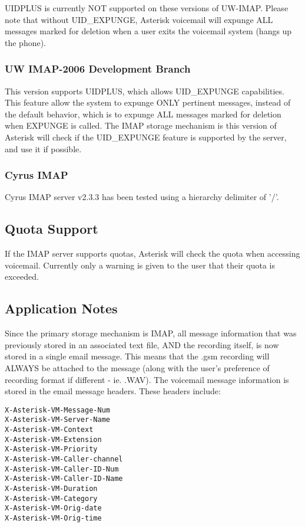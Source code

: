 UIDPLUS is currently NOT supported on these versions of UW-IMAP.  Please note
that without UID\_EXPUNGE, Asterisk voicemail will expunge ALL messages marked
for deletion when a user exits the voicemail system (hangs up the phone).

\subsubsection{UW IMAP-2006 Development Branch}

This version supports UIDPLUS, which allows UID\_EXPUNGE capabilities.  This
feature allow the system to expunge ONLY pertinent messages, instead of the
default behavior, which is to expunge ALL messages marked for deletion when
EXPUNGE is called.  The IMAP storage mechanism is this version of Asterisk
will check if the UID\_EXPUNGE feature is supported by the server, and use it
if possible. 

\subsubsection{Cyrus IMAP}

Cyrus IMAP server v2.3.3 has been tested using a hierarchy delimiter of '/'.  


\subsection{Quota Support}

If the IMAP server supports quotas, Asterisk will check the quota when
accessing voicemail.  Currently only a warning is given to the user that 
their quota is exceeded. 


\subsection{Application Notes}

Since the primary storage mechanism is IMAP, all message information that 
was previously stored in an associated text file, AND the recording itself,
is now stored in a single email message.  This means that the .gsm recording
will ALWAYS be attached to the message (along with the user's preference of
recording format if different - ie. .WAV).  The voicemail message information
is stored in the email message headers.  These headers include:

\begin{verbatim}
X-Asterisk-VM-Message-Num
X-Asterisk-VM-Server-Name
X-Asterisk-VM-Context
X-Asterisk-VM-Extension
X-Asterisk-VM-Priority
X-Asterisk-VM-Caller-channel
X-Asterisk-VM-Caller-ID-Num
X-Asterisk-VM-Caller-ID-Name
X-Asterisk-VM-Duration
X-Asterisk-VM-Category
X-Asterisk-VM-Orig-date
X-Asterisk-VM-Orig-time
\end{verbatim}

